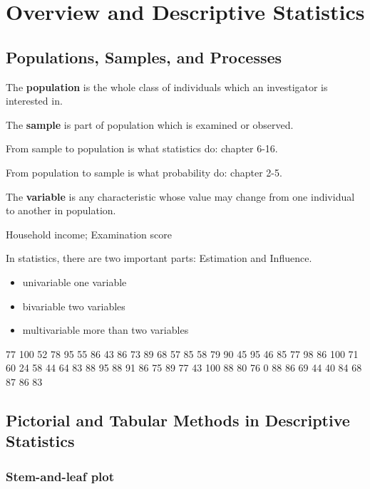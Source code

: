 \chapter{Overview and Descriptive Statistics}
\section{Populations, Samples, and Processes}
\begin{defn}
The \textbf{population} is the whole class of individuals which an investigator  is interested in.
\end{defn}

\begin{defn}
The \textbf{sample} is part of population which is examined or observed.
\end{defn}

From sample to population is what statistics do: chapter 6-16.

From population to sample is what probability do: chapter 2-5.
\begin{defn}
The \textbf{variable} is any characteristic whose value may change from one individual to another in population.
\end{defn}

\begin{exmp}
Household income; Examination score
\end{exmp}

In statistics, there are two important parts: Estimation and Influence.
\begin{itemize}
\item univariable one variable
\item bivariable two variables
\item multivariable more than two variables
\end{itemize}
\begin{exmp}
  77 100 52 78 95 55 86 43 86 73 89 68 57 85 58 79 90 45 95 46 85 77 98 86
  100 71 60 24 58 44 64 83 88 95 88 91 86 75 89 77 43 100 88 80 76 0 88 86
  69 44 40 84 68 87 86 83
\end{exmp}

\section{Pictorial and Tabular Methods in Descriptive Statistics}
\subsection{Stem-and-leaf plot}

